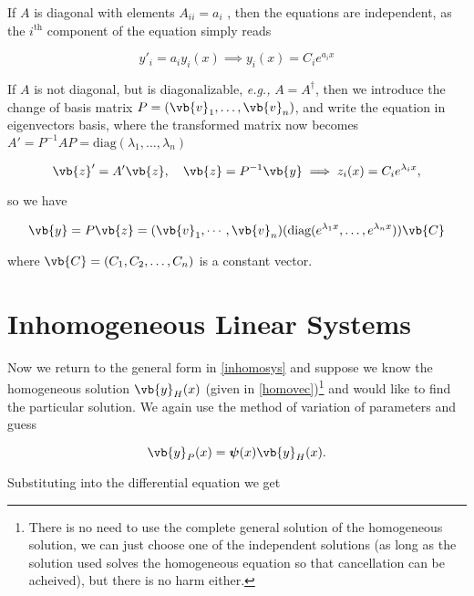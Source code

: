 \documentclass[english,a4paper,12pt]{report}
\begin{document}
If \(A\) is diagonal with elements \(A_{ii} = a_{i}\) , then the equations are independent, as the \(i^{\text{th}} \) component of the equation simply reads

\begin{equation}
    y'_{i} = a_{i} y_{i}(x) \implies y_{i} (x) = C_{i}e^{a_{i}x }    
\end{equation}

If \(A\) is not diagonal, but is diagonalizable, \textit{e.g.,} \(A = A^{\dagger} \), then we introduce the change of basis matrix \(P = (\vb{v} _1, \ldots ,  \vb{v} _n )\), and write the equation in eigenvectors basis, where the transformed matrix now becomes \(A' = P^{-1} AP = \text{diag}(\lambda _{1}, \ldots , \lambda _{n}  )\) 

\begin{equation}
    \vb{z}' = A' \vb{z}, \quad  \vb{z} = P^{-1} \vb{y} \implies z_{i}(x) = C_{i}e^{\lambda _{i}x },  
\end{equation}

so we have

\begin{equation}  \label{homovec} 
    \vb{y} = P \vb{z} = (\vb{v}_1, \cdots, \vb{v} _n ) (\text{diag}(e^{\lambda _{1}x }, \ldots , e^{\lambda _{n}x }  ))\vb{C} 
\end{equation}

where \(\vb{C} = (C_1 ,C_2 ,\ldots ,C_{n} )\) is a constant vector.

\section{Inhomogeneous Linear Systems}

Now we return to the general form in \cref{inhomosys} and suppose we know the homogeneous solution \(\vb{y} _{H}(x) \) (given in \cref{homovec})\footnote{There is no need to use the complete general solution of the homogeneous solution, we can just choose one of the independent solutions (as long as the solution used solves the homogeneous equation so that cancellation can be acheived), but there is no harm either.} and would like to find the particular solution. We again use the method of variation of parameters and guess 

\begin{equation}
    \vb{y} _{P}(x) = \boldsymbol{\psi }(x) \vb{y} _{H}(x).  
\end{equation}

Substituting into the differential equation we get
\end{document}
